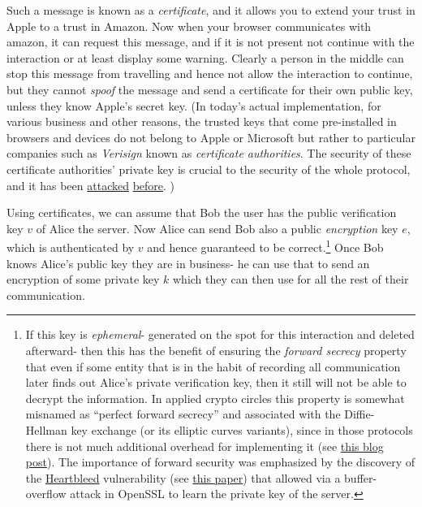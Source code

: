 Such a message is known as a \emph{certificate}, and it allows you to
extend your trust in Apple to a trust in Amazon. Now when your browser
communicates with amazon, it can request this message, and if it is not
present not continue with the interaction or at least display some
warning. Clearly a person in the middle can stop this message from
travelling and hence not allow the interaction to continue, but they
cannot \emph{spoof} the message and send a certificate for their own
public key, unless they know Apple's secret key. (In today's actual
implementation, for various business and other reasons, the trusted keys
that come pre-installed in browsers and devices do not belong to Apple
or Microsoft but rather to particular companies such as \emph{Verisign}
known as \emph{certificate authorities}. The security of these
certificate authorities' private key is crucial to the security of the
whole protocol, and it has been
\href{https://en.wikipedia.org/wiki/DigiNotar}{attacked}
\href{http://www.wired.com/2011/10/son-of-stuxnet-in-the-wild/}{before}.
)

Using certificates, we can assume that Bob the user has the public
verification key \(v\) of Alice the server. Now Alice can send Bob also
a public \emph{encryption} key \(e\), which is authenticated by \(v\)
and hence guaranteed to be correct.\footnote{If this key is
  \emph{ephemeral}- generated on the spot for this interaction and
  deleted afterward- then this has the benefit of ensuring the
  \emph{forward secrecy} property that even if some entity that is in
  the habit of recording all communication later finds out Alice's
  private verification key, then it still will not be able to decrypt
  the information. In applied crypto circles this property is somewhat
  misnamed as ``perfect forward secrecy'' and associated with the
  Diffie-Hellman key exchange (or its elliptic curves variants), since
  in those protocols there is not much additional overhead for
  implementing it (see
  \href{http://vincent.bernat.im/en/blog/2011-ssl-perfect-forward-secrecy.html}{this
  blog post}). The importance of forward security was emphasized by the
  discovery of the \href{http://heartbleed.com/}{Heartbleed}
  vulnerability (see
  \href{https://jhalderm.com/pub/papers/heartbleed-imc14.pdf}{this
  paper}) that allowed via a buffer-overflow attack in OpenSSL to learn
  the private key of the server.} Once Bob knows Alice's public key they
are in business- he can use that to send an encryption of some private
key \(k\) which they can then use for all the rest of their
communication.

